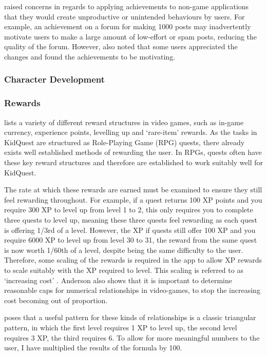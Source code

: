 \cite{Montola:2009:AGA:1621841.1621859} raised concerns in regards to applying achievements to non-game applications that they would create unproductive or unintended behaviours by users. 
For example, an achievement on a forum for making 1000 posts may inadvertently motivate users to make a large amount of low-effort or spam posts, reducing the quality of the forum.
However, \cite{Montola:2009:AGA:1621841.1621859} also noted that some users appreciated the changes and found the achievements to be motivating. 

\subsubsection{Character Development}

\subsubsection{Rewards}
\cite{king2010video} lists a variety of different reward structures in video games, such as in-game currency, experience points, levelling up and `rare-item' rewards. 
As the tasks in KidQuest are structured as Role-Playing Game (RPG) quests, there already exists well established methods of rewarding the user. 
In RPGs, quests often have these key reward structures and therefore are established to work suitably well for KidQuest.

The rate at which these rewards are earned must be examined to ensure they still feel rewarding throughout. 
For example, if a quest returns 100 XP points and you require 300 XP to level up from level 1 to 2, this only requires you to complete three quests to level up, meaning these three quests feel rewarding as each quest is offering 1/3rd of a level.
However, the XP if quests still offer 100 XP and you require 6000 XP to level up from level 30 to 31, the reward from the same quest is now worth 1/60th of a level, despite being the same difficulty to the user.
Therefore, some scaling of the rewards is required in the app to allow XP rewards to scale suitably with the XP required to level.
This scaling is referred to as `increasing cost' \citep{1_anderson_2016}.
Anderson also shows that it is important to determine reasonable caps for numerical relationships in video-games, to stop the increasing cost becoming out of proportion.

\cite{1_anderson_2016} poses that a useful pattern for these kinds of relationships is a classic triangular pattern, in which the first level requires 1 XP to level up, the second level requires 3 XP, the third requires 6. To allow for more meaningful numbers to the user, I have multiplied the results of the formula by 100.

